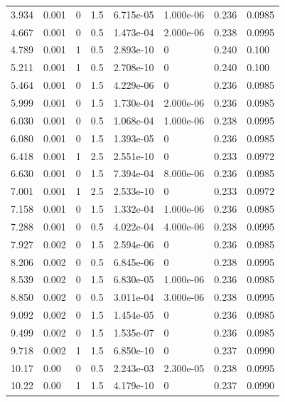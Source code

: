 \documentclass[preview]{standalone}
\begin{document}
{{\begin{tabular}{L{1.2cm}C{1.2cm} C{0.3cm}C{0.5cm} C{1.4cm}C{1.4cm} C{1.4cm}C{1.4cm}}
  3.934  &  0.001  & 0     & 1.5 &  6.715e-05  & 1.000e-06  & 0.236 &  0.0985   \\ 
  4.667  &  0.001  & 0     & 0.5 &  1.473e-04  & 2.000e-06  & 0.238 &  0.0995   \\ 
  4.789  &  0.001  & 1     & 0.5 &  2.893e-10  & 0  & 0.240 &  0.100   \\ 
  5.211  &  0.001  & 1     & 0.5 &  2.708e-10  & 0  & 0.240 &  0.100   \\ 
  5.464  &  0.001  & 0     & 1.5 &  4.229e-06  & 0  & 0.236 &  0.0985   \\ 
  5.999  &  0.001  & 0     & 1.5 &  1.730e-04  & 2.000e-06  & 0.236 &  0.0985   \\ 
  6.030  &  0.001  & 0     & 0.5 &  1.068e-04  & 1.000e-06  & 0.238 &  0.0995   \\ 
  6.080  &  0.001  & 0     & 1.5 &  1.393e-05  & 0  & 0.236 &  0.0985   \\ 
  6.418  &  0.001  & 1     & 2.5 &  2.551e-10  & 0  & 0.233 &  0.0972   \\ 
  6.630  &  0.001  & 0     & 1.5 &  7.394e-04  & 8.000e-06  & 0.236 &  0.0985   \\ 
  7.001  &  0.001  & 1     & 2.5 &  2.533e-10  & 0  & 0.233 &  0.0972   \\ 
  7.158  &  0.001  & 0     & 1.5 &  1.332e-04  & 1.000e-06  & 0.236 &  0.0985   \\ 
  7.288  &  0.001  & 0     & 0.5 &  4.022e-04  & 4.000e-06  & 0.238 &  0.0995   \\ 
  7.927  &  0.002  & 0     & 1.5 &  2.594e-06  & 0  & 0.236 &  0.0985   \\ 
  8.206  &  0.002  & 0     & 0.5 &  6.845e-06  & 0  & 0.238 &  0.0995   \\ 
  8.539  &  0.002  & 0     & 1.5 &  6.830e-05  & 1.000e-06  & 0.236 &  0.0985   \\ 
  8.850  &  0.002  & 0     & 0.5 &  3.011e-04  & 3.000e-06  & 0.238 &  0.0995   \\ 
  9.092  &  0.002  & 0     & 1.5 &  1.454e-05  & 0  & 0.236 &  0.0985   \\ 
  9.499  &  0.002  & 0     & 1.5 &  1.535e-07  & 0  & 0.236 &  0.0985   \\ 
  9.718  &  0.002  & 1     & 1.5 &  6.850e-10  & 0  & 0.237 &  0.0990   \\ 
  10.17  &  0.00  & 0     & 0.5 &  2.243e-03  & 2.300e-05  & 0.238 &  0.0995   \\ 
  10.22  &  0.00  & 1     & 1.5 &  4.179e-10  & 0  & 0.237 &  0.0990   \\ 

\end{tabular}}}
\end{document}
